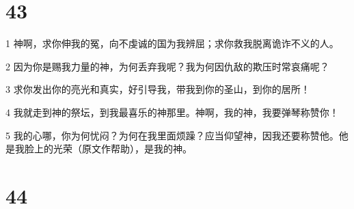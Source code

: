 \chapter{43}

\par 1 神啊，求你伸我的冤，向不虔诚的国为我辨屈；求你救我脱离诡诈不义的人。
\par 2 因为你是赐我力量的神，为何丢弃我呢？我为何因仇敌的欺压时常哀痛呢？
\par 3 求你发出你的亮光和真实，好引导我，带我到你的圣山，到你的居所！
\par 4 我就走到神的祭坛，到我最喜乐的神那里。神啊，我的神，我要弹琴称赞你！
\par 5 我的心哪，你为何忧闷？为何在我里面烦躁？应当仰望神，因我还要称赞他。他是我脸上的光荣（原文作帮助），是我的神。

\chapter{44}

